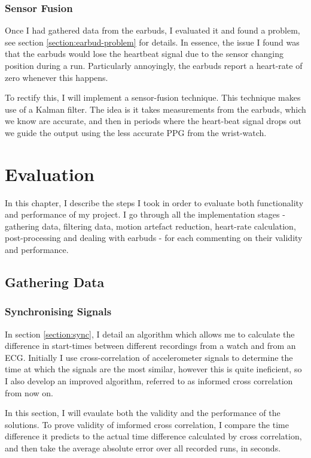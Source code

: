 \documentclass[12pt,a4paper,twoside,openright]{report}
\begin{document}
\subsection{Sensor Fusion}

Once I had gathered data from the earbuds, I evaluated it and found a problem,
see section \ref{section:earbud-problem} for details. In essence, the issue I
found was that the earbuds would lose the heartbeat signal due to the sensor
changing position during a run. Particularly annoyingly, the earbuds report a
heart-rate of zero whenever this happens. 

To rectify this, I will implement a sensor-fusion technique. This technique
makes use of a Kalman filter. The idea is it takes measurements from the earbuds, which
we know are accurate, and then in periods where the heart-beat signal drops
out we guide the output using the less accurate PPG from the wrist-watch.



\chapter{Evaluation}

In this chapter, I describe the steps I took in order to evaluate both
functionality and performance of my project. I go through all the
implementation stages - gathering data, filtering data, motion artefact
reduction, heart-rate calculation, post-processing and dealing with earbuds -
for each commenting on their validity and performance.

\section{Gathering Data}

\subsection{Synchronising Signals}

In section \ref{section:sync}, I detail an algorithm which allows me to
calculate the difference in start-times between different recordings from a
watch and from an ECG. Initially I use cross-correlation of accelerometer signals to
determine the time at which the signals are the most similar, however this is
quite ineficient, so I also develop an improved algorithm, referred to as
informed cross correlation from now on.

In this section, I will evaulate both the validity and the performance of the
solutions. To prove validity of imformed cross correlation, I compare the
time difference it predicts to the actual time difference calculated by cross
correlation, and then take the average absolute error over all recorded runs,
in seconds. 
\end{document}
